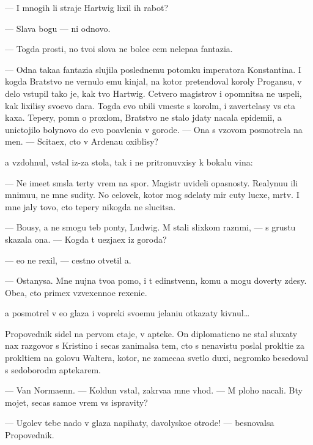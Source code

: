 \documentclass[10pt]{book}
\begin{document}
— I mnogih li straje{\y} Hartwig lixil ih rabot{\yi}?

— Slava bogu — ni odnovo.

— Togda prosti, no tvo{\y}i slova ne bole{\y}e cem nelepa{\y}a fantazi{\y}a.

— Odna taka{\y}a fantazi{\y}a slujila poslednemu potomku imperatora Konstantina. I kogda Bratstvo ne vernulo {\y}emu kinjal, na kotor{\yi}{\y} pretendoval koroly Progansu, v delo vstupil tako{\y} je, kak tvo{\y} Hartwig. Cetvero magistrov i opomnitsa ne uspeli, kak lixilisy svo{\y}evo dara. Togda {\y}evo ubili vmeste s korol{\e}m, i zavertelasy vs{\ia} eta kaxa. Tepery, pomn{\ia} o proxlom, Bratstvo ne stalo jdaty nacala epidemi{\y}i, a unictojilo bolynovo do {\y}evo po{\y}avleni{\y}a v gorode. — Ona s v{\yi}zovom posmotrela na men{\ia}. — Scita{\y}ex, cto v Ardenau oxiblisy?

{\Y}a vzdohnul, vstal iz-za stola, tak i ne pritronuvxisy k bokalu vina:

— Ne ime{\y}et sm{\yi}sla ter{\ia}ty vrem{\ia} na spor{\yi}. Magistr{\yi} uvideli opasnosty. Realynu{\y}u ili mnimu{\y}u, ne mne sudity. No celovek, kotor{\yi}{\y} mog sdelaty mir cuty lucxe, m{\e}rtv. I mne jaly tovo, cto tepery nikogda ne slucitsa.

— Bo{\y}usy, {\y}a ne smogu teb{\ia} pon{\ia}ty, Ludwig. M{\yi} stali slixkom razn{\yi}mi, — s grust{\y}u skazala ona. — Kogda t{\yi} u{\y}ezja{\y}ex iz goroda?

— {\Y}e{\x}o ne rexil, — cestno otvetil {\y}a.

— Ostanysa. Mne nujna tvo{\y}a pomo{\x}, i t{\yi} {\y}edinstvenn{\yi}{\y}, komu {\y}a mogu dover{\ia}ty zdesy. Obe{\x}a{\y}, cto primex vzvexenno{\y}e rexeni{\y}e.

{\Y}a posmotrel v {\y}e{\y}o glaza i vopreki svo{\y}emu jelani{\y}u otkazaty kivnul…

Propovednik sidel na pervom etaje, v apteke. On diplomaticno ne stal sluxaty nax razgovor s Kristino{\y} i se{\y}cas zanimalsa tem, cto s nenavist{\y}u pos{\yi}lal prokl{\ia}ti{\y}e za prokl{\ia}ti{\y}em na golovu Waltera, kotor{\yi}{\y}, ne zameca{\y}a svetlo{\y} duxi, negromko besedoval s sedoborod{\yi}m aptekarem.

— Van Normaenn. — Koldun vstal, zakr{\yi}va{\y}a mne v{\yi}hod. — M{\yi} ploho nacali. B{\yi}ty mojet, se{\y}cas samo{\y}e vrem{\ia} vs{\e} ispravity?

— Ugol{\y}ev tebe nado v glaza napihaty, d{\y}avolysko{\y}e otrod{\y}e! — besnovalsa Propovednik.
\end{document}
